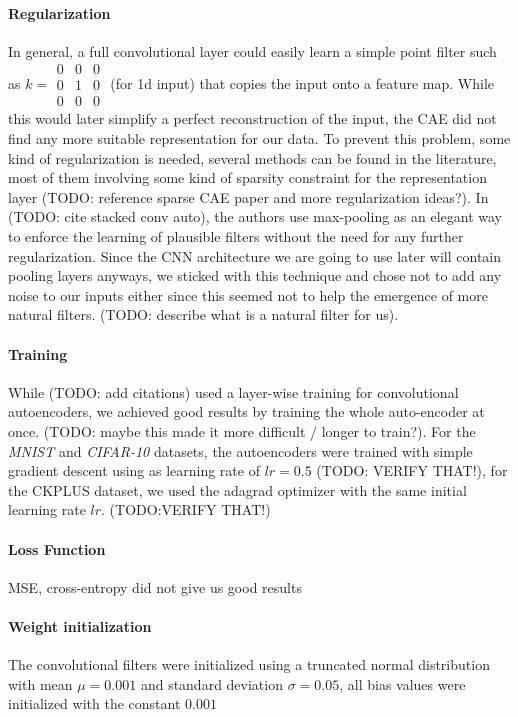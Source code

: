 \documentclass[draft]{article}
\begin{document}
    \paragraph{Regularization} In general, a full convolutional layer could easily learn a simple point filter such as $k = \begin{smallmatrix} 0&0&0\\ 0&1&0 \\ 0&0&0 \end{smallmatrix}$ (for 1d input) that copies the input onto a feature map. While this would later simplify a perfect reconstruction of the input, the CAE did not find any more suitable representation for our data. To prevent this problem, some kind of regularization is needed, several methods can be found in the literature, most of them involving some kind of sparsity constraint for the representation layer (TODO: reference sparse CAE paper and more regularization ideas?). In (TODO: cite stacked conv auto), the authors use max-pooling as an elegant way to enforce the learning of plausible filters without the need for any further regularization. Since the CNN architecture we are going to use later will contain pooling layers anyways, we sticked with this technique and chose not to add any noise to our inputs either since this seemed not to help the emergence of more natural filters. (TODO: describe what is a natural filter for us). 

    \paragraph{Training} While (TODO: add citations) used a layer-wise training for convolutional autoencoders, we achieved good results by training the whole auto-encoder at once. (TODO: maybe this made it more difficult / longer to train?). For the \emph{MNIST} and \emph{CIFAR-10} datasets, the autoencoders were trained with simple gradient descent using as learning rate of $lr = 0.5$ (TODO: VERIFY THAT!), for the CKPLUS dataset, we used the adagrad optimizer with the same initial learning rate $lr$. (TODO:VERIFY THAT!)

    \paragraph{Loss Function} MSE, cross-entropy did not give us good results

    \paragraph{Weight initialization} The convolutional filters were initialized using a truncated normal distribution with mean $\mu = 0.001$ and standard deviation $\sigma = 0.05$, all bias values were initialized with the constant $0.001$
\end{document}
